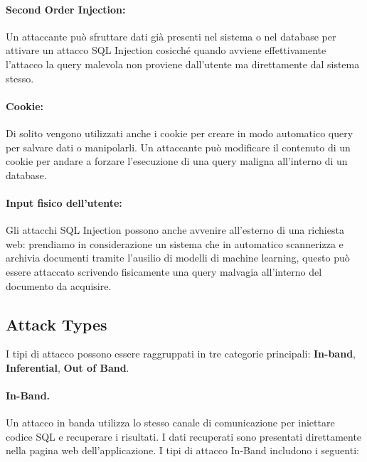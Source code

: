 \paragraph{Second Order Injection:}
Un attaccante può sfruttare dati già presenti nel sistema o nel database per
attivare un attacco SQL Injection cosicché quando avviene effettivamente
l'attacco la query malevola non proviene dall'utente ma direttamente dal sistema
stesso.

\paragraph{Cookie:}
Di solito vengono utilizzati anche i cookie per creare in modo automatico query
per salvare dati o manipolarli. Un attaccante può modificare il contenuto di un
cookie per andare a forzare l'esecuzione di una query maligna all'interno di un
database.

\paragraph{Input fisico dell'utente:}
Gli attacchi SQL Injection possono anche avvenire all'esterno di una richiesta
web: prendiamo in considerazione un sistema che in automatico scannerizza e
archivia documenti tramite l'ausilio di modelli di machine learning, questo può
essere attaccato scrivendo fisicamente una query malvagia all'interno del
documento da acquisire.


\subsection{Attack Types}

I tipi di attacco possono essere raggruppati in tre categorie principali:
\textbf{In-band}, \textbf{Inferential}, \textbf{Out of Band}.

\paragraph{In-Band.}
Un attacco in banda utilizza lo stesso canale di comunicazione per iniettare
codice SQL e recuperare i risultati. I dati recuperati sono presentati
direttamente nella pagina web dell'applicazione. I tipi di attacco In-Band
includono i seguenti:

